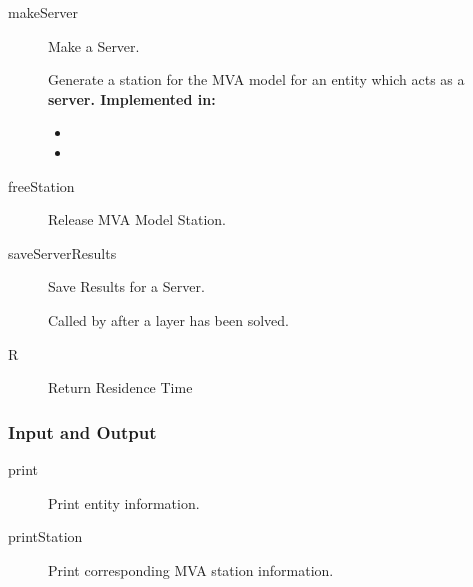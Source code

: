 \begin{description}

\label{sec:entity-makeServer}
\item[makeServer] \texonly{---} Make a Server.\\

Generate a station for the MVA model for an entity which acts as a
\bf{server}.  Implemented in:
\begin{itemize}
\item {}
\item {}
\end{itemize}

\item[freeStation] \texonly{---} Release MVA Model Station.\\

\label{sec:entity-saveServerResults}
\item[saveServerResults] \texonly{---} Save Results for a Server.\\

Called by  after a layer has been
solved. 

\item[R] \texonly{---} Return Residence Time\\

\end{description}
\subsubsection{Input and Output}

\begin{description}
\item[print] \texonly{---} Print entity information.\\

\item[printStation] \texonly{---} Print corresponding MVA station information.\\

\end{description}

